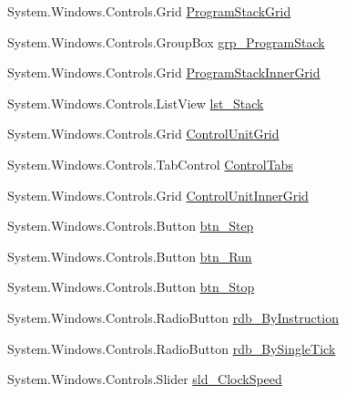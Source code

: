 \begin{DoxyCompactItemize}
\item 
System.\+Windows.\+Controls.\+Grid \hyperlink{class_c_p_u___o_s___simulator_1_1_main_window_a59373e8f8822e4efea670d9fb87a1b32}{Program\+Stack\+Grid}
\item 
System.\+Windows.\+Controls.\+Group\+Box \hyperlink{class_c_p_u___o_s___simulator_1_1_main_window_a10687b397ff3a0381a556096a14ed0b0}{grp\+\_\+\+Program\+Stack}
\item 
System.\+Windows.\+Controls.\+Grid \hyperlink{class_c_p_u___o_s___simulator_1_1_main_window_a8c373866c86f6be0e7ef487a5ccb8c3c}{Program\+Stack\+Inner\+Grid}
\item 
System.\+Windows.\+Controls.\+List\+View \hyperlink{class_c_p_u___o_s___simulator_1_1_main_window_a8453db331c7cc1e7c1e711a06b2ec30c}{lst\+\_\+\+Stack}
\item 
System.\+Windows.\+Controls.\+Grid \hyperlink{class_c_p_u___o_s___simulator_1_1_main_window_af6e1d9a71f9501c02b62e8319ba11b5a}{Control\+Unit\+Grid}
\item 
System.\+Windows.\+Controls.\+Tab\+Control \hyperlink{class_c_p_u___o_s___simulator_1_1_main_window_acc893fc507d9ea08cc4a923bdc23091d}{Control\+Tabs}
\item 
System.\+Windows.\+Controls.\+Grid \hyperlink{class_c_p_u___o_s___simulator_1_1_main_window_a0bb4b4233380c349ee3bef69813a684b}{Control\+Unit\+Inner\+Grid}
\item 
System.\+Windows.\+Controls.\+Button \hyperlink{class_c_p_u___o_s___simulator_1_1_main_window_acd572aa9d278af703febb634fc1c34a3}{btn\+\_\+\+Step}
\item 
System.\+Windows.\+Controls.\+Button \hyperlink{class_c_p_u___o_s___simulator_1_1_main_window_ab3286e931d7154605876654bbf092840}{btn\+\_\+\+Run}
\item 
System.\+Windows.\+Controls.\+Button \hyperlink{class_c_p_u___o_s___simulator_1_1_main_window_a1b6b541d9765ca230f537d1d6b6c83aa}{btn\+\_\+\+Stop}
\item 
System.\+Windows.\+Controls.\+Radio\+Button \hyperlink{class_c_p_u___o_s___simulator_1_1_main_window_acba6218f7f716645443533815c6bd7a3}{rdb\+\_\+\+By\+Instruction}
\item 
System.\+Windows.\+Controls.\+Radio\+Button \hyperlink{class_c_p_u___o_s___simulator_1_1_main_window_ab40dcb618f5398ab67213476fe1b86ca}{rdb\+\_\+\+By\+Single\+Tick}
\item 
System.\+Windows.\+Controls.\+Slider \hyperlink{class_c_p_u___o_s___simulator_1_1_main_window_a39cd3af9bb0f8a3ccd06fdd44c9ed6a3}{sld\+\_\+\+Clock\+Speed}

\end{DoxyCompactItemize}

